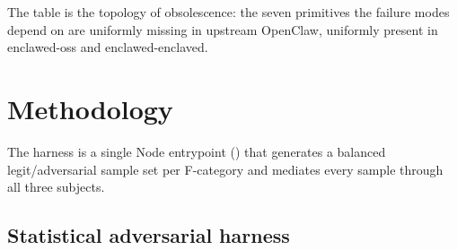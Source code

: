 \documentclass[11pt]{article}
\begin{document}
\begin{table}[h]
\centering
\footnotesize
\setlength{\tabcolsep}{4pt}
\caption{Empirical detection-primitive availability per subject. The probe
walked 14{,}419 upstream files and found zero matches for any of the seven
canonical symbols on OpenClaw.}
\label{tab:primitive-presence}
\end{table}

\noindent The table is the topology of obsolescence: the seven primitives
the failure modes depend on are uniformly missing in upstream OpenClaw,
uniformly present in enclawed-oss and enclawed-enclaved.

\section{Methodology}
\label{sec:methodology}

The harness is a single Node entrypoint
() that
generates a balanced legit/adversarial sample set per F-category and
mediates every sample through all three subjects.

\subsection{Statistical adversarial harness}
\end{document}
